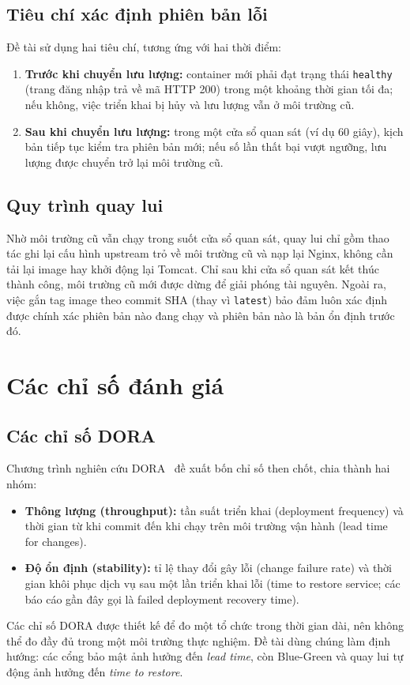 \documentclass[12pt,a4paper,oneside]{extreport}
\begin{document}
\subsection{Tiêu chí xác định phiên bản lỗi}
Đề tài sử dụng hai tiêu chí, tương ứng với hai thời điểm:
\begin{enumerate}
  \item \textbf{Trước khi chuyển lưu lượng:} container mới phải đạt trạng thái
  \texttt{healthy} (trang đăng nhập trả về mã HTTP 200) trong một khoảng thời gian
  tối đa; nếu không, việc triển khai bị hủy và lưu lượng vẫn ở môi trường cũ.
  \item \textbf{Sau khi chuyển lưu lượng:} trong một cửa sổ quan sát (ví dụ 60
  giây), kịch bản tiếp tục kiểm tra phiên bản mới; nếu số lần thất bại vượt
  ngưỡng, lưu lượng được chuyển trở lại môi trường cũ.
\end{enumerate}

\subsection{Quy trình quay lui}
Nhờ môi trường cũ vẫn chạy trong suốt cửa sổ quan sát, quay lui chỉ gồm thao tác
ghi lại cấu hình upstream trỏ về môi trường cũ và nạp lại Nginx, không cần tải
lại image hay khởi động lại Tomcat. Chỉ sau khi cửa sổ quan sát kết thúc thành
công, môi trường cũ mới được dừng để giải phóng tài nguyên. Ngoài ra, việc gắn
tag image theo commit SHA (thay vì \texttt{latest}) bảo đảm luôn xác định được
chính xác phiên bản nào đang chạy và phiên bản nào là bản ổn định trước đó.

\section{Các chỉ số đánh giá}
\label{sec:metrics}
\subsection{Các chỉ số DORA}
Chương trình nghiên cứu DORA~\cite{dora, forsgren2018} đề xuất bốn chỉ số then
chốt, chia thành hai nhóm:
\begin{itemize}
  \item \textbf{Thông lượng (throughput):} tần suất triển khai (deployment
  frequency) và thời gian từ khi commit đến khi chạy trên môi trường vận hành
  (lead time for changes).
  \item \textbf{Độ ổn định (stability):} tỉ lệ thay đổi gây lỗi (change failure
  rate) và thời gian khôi phục dịch vụ sau một lần triển khai lỗi (time to
  restore service; các báo cáo gần đây gọi là failed deployment recovery time).
\end{itemize}
Các chỉ số DORA được thiết kế để đo một tổ chức trong thời gian dài, nên không
thể đo đầy đủ trong một môi trường thực nghiệm. Đề tài dùng chúng làm định
hướng: các cổng bảo mật ảnh hưởng đến \textit{lead time}, còn Blue-Green và quay
lui tự động ảnh hưởng đến \textit{time to restore}.
\end{document}
